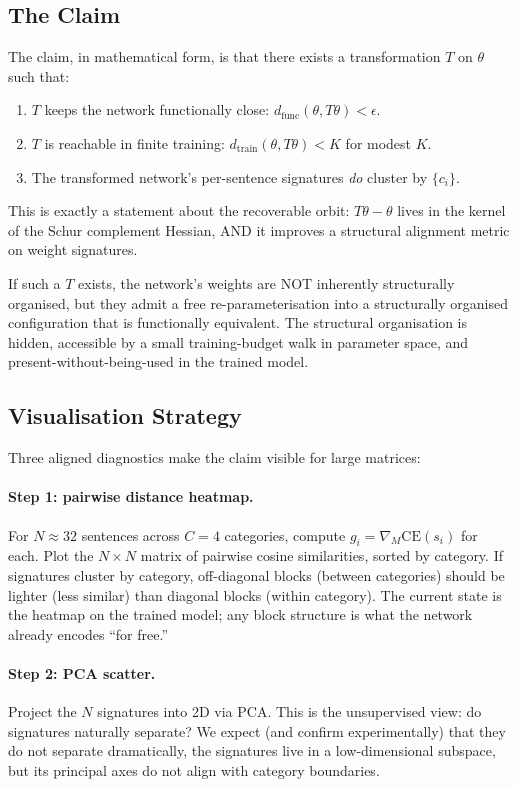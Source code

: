 \documentclass[11pt, a4paper]{article}
\theoremstyle{plain}
\theoremstyle{definition}
\theoremstyle{remark}
\begin{document}
\subsection{The Claim}

The claim, in mathematical form, is that there exists a transformation $T$ on $\theta$ such that:
\begin{enumerate}[nosep]
\item $T$ keeps the network functionally close: $d_{\text{func}}(\theta, T\theta) < \epsilon$.
\item $T$ is reachable in finite training: $d_{\text{train}}(\theta, T\theta) < K$ for modest $K$.
\item The transformed network's per-sentence signatures \emph{do} cluster by $\{c_i\}$.
\end{enumerate}
This is exactly a statement about the recoverable orbit: $T\theta - \theta$ lives in the kernel of the Schur complement Hessian, AND it improves a structural alignment metric on weight signatures.

If such a $T$ exists, the network's weights are NOT inherently structurally organised, but they admit a free re-parameterisation into a structurally organised configuration that is functionally equivalent.
The structural organisation is hidden, accessible by a small training-budget walk in parameter space, and present-without-being-used in the trained model.

\subsection{Visualisation Strategy}

Three aligned diagnostics make the claim visible for large matrices:

\paragraph{Step 1: pairwise distance heatmap.}
For $N \approx 32$ sentences across $C = 4$ categories, compute $g_i = \nabla_M \mathrm{CE}(s_i)$ for each.
Plot the $N \times N$ matrix of pairwise cosine similarities, sorted by category.
If signatures cluster by category, off-diagonal blocks (between categories) should be lighter (less similar) than diagonal blocks (within category).
The current state is the heatmap on the trained model; any block structure is what the network already encodes ``for free.''

\paragraph{Step 2: PCA scatter.}
Project the $N$ signatures into 2D via PCA.
This is the unsupervised view: do signatures naturally separate?
We expect (and confirm experimentally) that they do not separate dramatically, the signatures live in a low-dimensional subspace, but its principal axes do not align with category boundaries.
\end{document}
